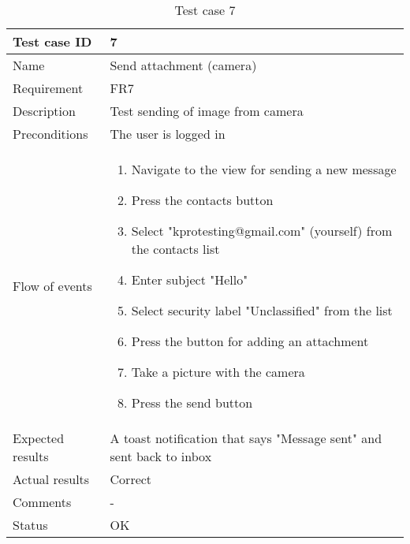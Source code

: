 		\begin{table}[htb]
			\begin{tabular}{l|p{10cm}}
				Test case ID & 7 \\ \hline
				Name & Send attachment (camera)\\ \hline
				Requirement & FR7\\ \hline
				Description & Test sending of image from camera\\ \hline
				Preconditions & The user is logged in\\ \hline
				Flow of events & 
					\begin{enumerate}
						\item{}Navigate to the view for sending a new message
						\item{}Press the contacts button
						\item{}Select "kprotesting@gmail.com" (yourself) from the contacts list
						\item{}Enter subject "Hello"
						\item{}Select security label "Unclassified" from the list
						\item{}Press the button for adding an attachment
						\item{}Take a picture with the camera
						\item{}Press the send button
					\end{enumerate} \\ \hline
				Expected results & A toast notification that says "Message sent" and sent back to inbox\\ \hline
				Actual results & Correct\\ \hline
				Comments & -\\ \hline
				Status &OK \\ \hline
			\end{tabular}
			\caption{Test case 7} \label{tab:case7}
		\end{table}

